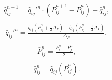\documentclass[a4paper,12pt,russian]{extreport}
\begin{document}
    \begin{eqnarray}
        \begin{gathered}
            \hat{q}_{ij}^{n+1} = \hat{q}_{ij}'^n \cdot \left(\bar{P}_{ij}^{n+1}-\bar{P}_{ij}^n\right)+\hat{q}_{ij}^n,
        \end{gathered}
    \end{eqnarray}
    \begin{eqnarray}
        \begin{gathered}
            \hat{q}_{ij}'^n = \frac{\hat{q}_{ij}\left(\bar{P}_{ij}^n+ \frac{1}{2}\Delta_P\right)-
            \hat{q}_{ij}\left(\bar{P}_{ij}^n-\frac{1}{2}\Delta_P\right)}{{\Delta_P}},
        \end{gathered}
    \end{eqnarray}
    \begin{eqnarray}
        \begin{gathered}
            \bar{P}^{n}_{ij} = \frac{P^n_i+P^n_j}{2},
        \end{gathered}
    \end{eqnarray}
    \begin{eqnarray}
        \begin{gathered}
            \hat{q}_{ij}^{n} = \hat{q}_{ij}\left(\bar{P}_{ij}^n\right).
        \end{gathered}
    \end{eqnarray}
\end{document}
